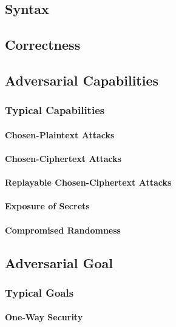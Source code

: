 \documentclass[a4paper,orivec]{llncs}
\begin{document}
\subsection{Syntax}

\subsection{Correctness}

\subsection{Adversarial Capabilities}

\subsubsection{Typical Capabilities}

\paragraph{Chosen-Plaintext Attacks}

\paragraph{Chosen-Ciphertext Attacks}

\paragraph{Replayable Chosen-Ciphertext Attacks}

\paragraph{Exposure of Secrets}

\paragraph{Compromised Randomness}

\subsection{Adversarial Goal}

\subsubsection{Typical Goals}

\paragraph{One-Way Security}
\end{document}
